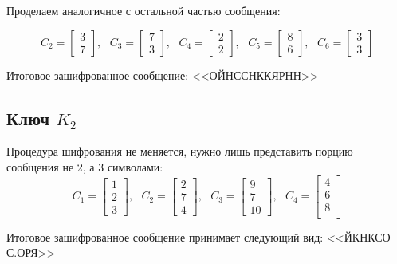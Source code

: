 \documentclass[a4paper,hidelinks,14pt]{extarticle}
\begin{document}
	Проделаем аналогичное с остальной частью сообщения:
	
	$$
	C_2 = \begin{bmatrix}
		3 \\
		7
	\end{bmatrix}, \text{ }
	C_3 = \begin{bmatrix}
		7 \\
		3
	\end{bmatrix}, \text{ }
	C_4 = \begin{bmatrix}
		2 \\
		2
	\end{bmatrix}, \text{ }
	C_5 = \begin{bmatrix}
		8 \\
		6
	\end{bmatrix}, \text{ }
	C_6 = \begin{bmatrix}
		3 \\
		3
	\end{bmatrix}
	$$
	
	Итоговое зашифрованное сообщение: <<ОЙНССНККЯРНН>>
	
	\subsection{Ключ $K_2$}
	Процедура шифрования не меняется, нужно лишь представить порцию сообщения не 2, а 3 символами:
	$$
	C_1 = \begin{bmatrix}
		1 \\
		2 \\
		3
	\end{bmatrix}, \text{ }
	C_2 = \begin{bmatrix}
		2 \\
		7 \\
		4
	\end{bmatrix}, \text{ }
	C_3 = \begin{bmatrix}
		9 \\
		7 \\
		10
	\end{bmatrix}, \text{ }
	C_4 = \begin{bmatrix}
		4 \\
		6  \\
		8  \\
	\end{bmatrix}
	$$
	
	Итоговое зашифрованное сообщение принимает следующий вид: <<ЙКНКСО С.ОРЯ>>
	
\end{document}
